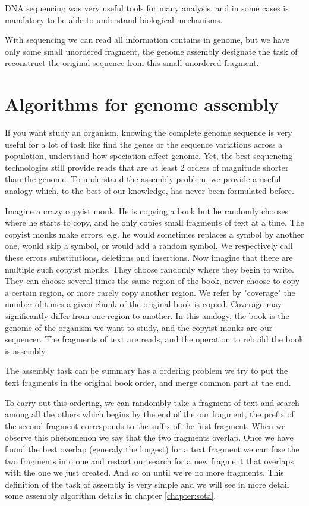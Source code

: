\documentclass[./main.tex]{subfiles}
\begin{document}
DNA sequencing was very useful tools for many analysis, and in some cases is mandatory to be able to understand biological mechanisms. 

With sequencing we can read all information contains in genome, but we have only some small unordered fragment, the genome assembly designate the task of reconstruct the original sequence from this small unordered fragment.

\section{Algorithms for genome assembly}

If you want study an organism, knowing the complete genome sequence is very useful for a lot of task like find the genes or the sequence variations across a population, understand how speciation affect genome. Yet, the best sequencing technologies still provide reads that are at least 2 orders of magnitude shorter than the genome. To understand the assembly problem, we provide a useful analogy which, to the best of our knowledge, has never been formulated before.

Imagine a crazy copyist monk. He is copying a book but he randomly chooses where he starts to copy, and he only copies small fragments of text at a time.
The copyist monks make errors, e.g. he would sometimes replaces a symbol by another one, would skip a symbol, or would add a random symbol. We respectively call these errors substitutions, deletions and insertions.
Now imagine that there are multiple such copyist monks.
They choose randomly where they begin to write. They can choose several times the same region of the book, never choose to copy a certain region, or more rarely copy another region. We refer by "coverage" the number of times a given chunk of the original book is copied. Coverage may significantly differ from one region to another.
In this analogy, the book is the genome of the organism we want to study, and the copyist monks are our sequencer. The fragments of text are reads, and the operation to rebuild the book is assembly.

The assembly task can be summary has a ordering problem we try to put the text fragments in the original book order, and merge common part at the end.

To carry out this ordering, we can randombly take a fragment of text and search among all the others which begins by the end of the our fragment, the prefix of the second fragment corresponds to the suffix of the first fragment. When we observe this phenomenon we say that the two fragments overlap. Once we have found the best overlap (generaly the longest) for a text fragment we can fuse the two fragments into one and restart our search for a new fragment that overlaps with the one we just created. And so on until we're no more fragments. This definition of the task of assembly is very simple and we will see in more detail some assembly algorithm details in chapter \ref{chapter:sota}.
\end{document}
